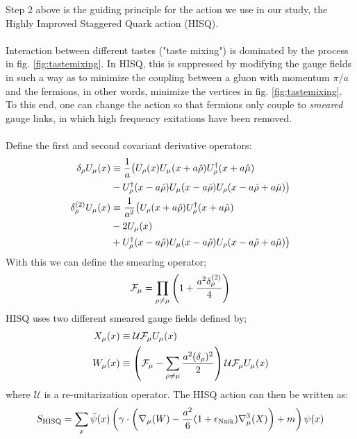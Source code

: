 \documentclass[a4paper,10pt]{article}
\numberwithin{equation}{section}
\begin{document}
Step 2 above is the guiding principle for the action we use in our study, the Highly Improved Staggered Quark action (HISQ). 
\\ \\
Interaction between different tastes ("taste mixing") is dominated by the process in fig. \ref{fig:tastemixing}. In HISQ, this is suppressed by modifying the gauge fields in such a way as to minimize the coupling between a gluon with momentum ${\pi/a}$ and the fermions, in other words, minimize the vertices in fig. \ref{fig:tastemixing}. To this end, one can change the action so that fermions only couple to \textit{smeared} gauge links, in which high frequency exitations have been removed. \\ \\
Define the first and second covariant derivative operators:
\begin{align}
	\nonumber
	\delta_{\rho}U_{\mu}(x) & \equiv {1\over a} \big( U_{\rho} (x) U_{\mu} (x + a\hat{\rho}) U_{\rho}^{\dagger}(x+a\hat{\mu}) \\
	& - U_{\rho}^{\dagger}(x-a\hat{\rho})U_{\mu}(x-a\hat{\rho})U_{\rho}(x-a\hat{\rho}+a\hat{\mu})\big)  \\
	\nonumber
	\delta_{\rho}^{(2)} U_{\mu}(x) & \equiv {1\over a^2} \big( U_{\rho}(x+a\hat{\rho})U^{\dagger}_{\rho}(x+a\hat{\mu}) \\
	\nonumber	
	& - 2U_{\mu}(x) \\
	& + U_{\rho}^{\dagger}(x-a\hat{\rho})U_{\mu}(x-a\hat{\rho})U_{\rho}(x - a\hat{\rho} + a\hat{\mu}) \big)
\end{align}
With this we can define the smearing operator;
\begin{align}
	\mathcal{F}_{\mu} = \prod_{\rho\neq\mu} \left( 1 + {a^2 \delta^{(2)}_{\rho}\over 4} \right)
\end{align}
HISQ uses two different smeared gauge fields defined by;
\begin{align}
	X_{\mu}(x) &\equiv \mathcal{U} \mathcal{F}_{\mu} U_{\mu}(x) \\
	W_{\mu}(x) &\equiv \left(\mathcal{F}_{\mu} - \sum_{\rho\neq\mu}{a^2(\delta_{\rho})^2\over 2} \right) \mathcal{U} \mathcal{F}_{\mu} U_{\mu}(x)
	\label{eq:gaugesmearing}
\end{align}
where $\mathcal{U}$ is a re-unitarization operator. The HISQ action can then be written as:
\begin{align}
	S_{\text{HISQ}} = \sum_{x} \bar{\psi}(x) \left( \gamma\cdot \left( \nabla_{\mu}(W) - {a^2\over 6}(1+\epsilon_{\text{Naik}})\nabla^3_{\mu}(X) \right) + m \right) \psi(x)
\end{align}
\end{document}
